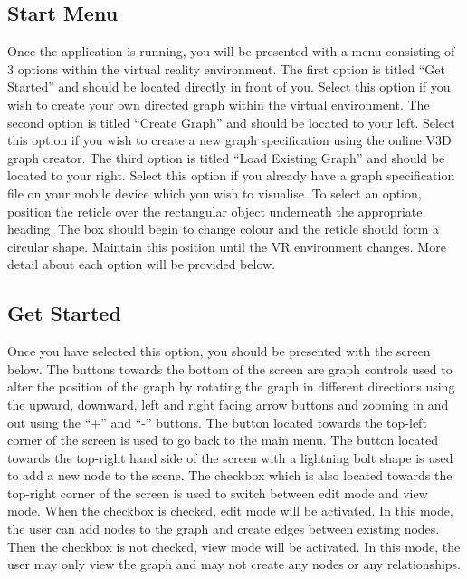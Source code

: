 \documentclass[english]{article}
\begin{document}
\subsection{Start Menu}
Once the application is running, you will be presented with a menu consisting of 3 options within the virtual reality environment. The first option is titled “Get Started” and should be located directly in front of you. Select this option if you wish to create your own directed graph within the virtual environment. The second option is titled “Create Graph” and should be located to your left. Select this option if you wish to create a new graph specification using the online V3D graph creator. The third option is titled “Load Existing Graph” and should be located to your right. Select this option if you already have a graph specification file on your mobile device which you wish to visualise. To select an option, position the reticle over the rectangular object underneath the appropriate heading. The box should begin to change colour and the reticle should form a circular shape. Maintain this position until the VR environment changes. More detail about each option will be provided below.

\subsection{Get Started}
Once you have selected this option, you should be presented with the screen below. The buttons towards the bottom of the screen are graph controls used to alter the position of the graph by rotating the graph in different directions using the upward, downward, left and right facing arrow buttons and zooming in and out using the “+” and “-” buttons. The button located towards the top-left corner of the screen is used to go back to the main menu. The button located towards the top-right hand side of the screen with a lightning bolt shape is used to add a new node to the scene. The checkbox which is also located towards the top-right corner of the screen is used to switch between edit mode and view mode. When the checkbox is checked, edit mode will be activated. In this mode, the user can add nodes to the graph and create edges between existing nodes. Then the checkbox is not checked, view mode will be activated. In this mode, the user may only view the graph and may not create any nodes or any relationships. 
\end{document}
